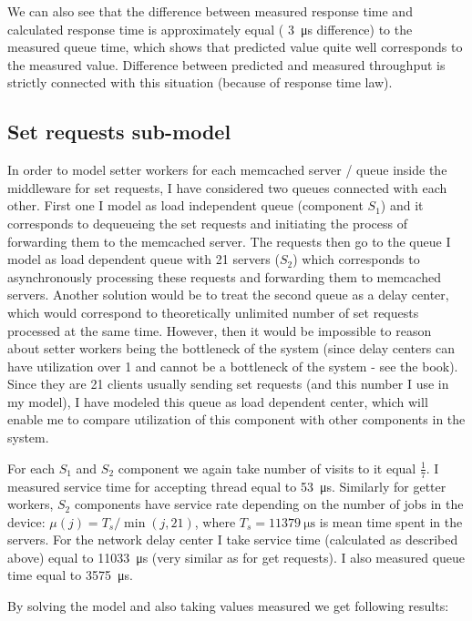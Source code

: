 \documentclass[11pt]{article}
\begin{document}
We can also see that the difference between measured response time and calculated response time is approximately equal  ( \SI{3}{\micro\second} difference) to the measured queue time, which shows that predicted value quite well corresponds to the measured value. Difference between predicted and measured throughput is strictly connected with this situation (because of response time law).

\subsection{Set requests sub-model}

In order to model setter workers for each memcached server / queue inside the middleware for set requests, I have considered two queues connected with each other. First one I model as load independent queue (component $S_1$) and it corresponds to dequeueing the set requests and initiating the process of forwarding them to the memcached server. The requests then go to the queue I model as load dependent queue with 21 servers ($S_2$) which corresponds to asynchronously processing these requests and forwarding them to memcached servers. Another solution would be to treat the second queue as a delay center, which would correspond to theoretically unlimited number of set requests processed at the same time. However, then it would be impossible to reason about setter workers being the bottleneck of the system (since delay centers can have utilization over 1 and cannot be a bottleneck of the system - see the book). Since they are 21 clients usually sending set requests (and this number I use in my model), I have modeled this queue as load dependent center, which will enable me to compare utilization of this component with other components in the system. 

For each $S_1$ and $S_2$ component we again take number of visits to it equal $\frac{1}{7}$.
I measured service time for accepting thread equal to \SI{53}{\micro\second}.
Similarly for getter workers, $S_2$ components have service rate depending on the number of jobs in the device: $\mu(j) = T_s / \min(j, 21)$, where $T_s = \SI{11379}{\micro\second}$
is mean time spent in the servers. 
For the network delay center I take service time (calculated as described above) equal to \SI{11033}{\micro\second} (very similar as for get requests).
I also measured queue time equal to \SI{3575}{\micro\second}.

By solving the model and also taking values measured we get following results:
\end{document}
